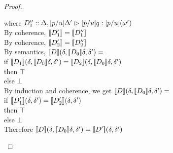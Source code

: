 \begin{proof}
\begin{enumerate}
\begin{itemize}
\begin{tabbedproof}
      \oooo where $D''_1 :: \judgeA[{\Delta, [p/u]\Delta'}]{[p/u]q}{[p/u](\omega')}$ \\
      \oooo By coherence, $\interp{D'_1} = \interp{D''_1}$ \\
      \oooo By coherence, $\interp{D'_2} = \interp{D''_2}$ \\
      \oooo By semantics, $\interp{D}(\delta, \interp{D_0}\delta, \delta') = $ \\
      \oooox if $\interp{D_1}(\delta, \interp{D_0}\delta, \delta') = 
                  \interp{D_2}(\delta, \interp{D_0}\delta, \delta')$ \\
      \oooox then $\top$ \\
      \oooox else $\bot$ \\
      \oooo By induction and coherence, we get $\interp{D}(\delta, \interp{D_0}\delta, \delta') = $ \\
      \oooox if $\interp{D'_1}(\delta, \delta') = 
                 \interp{D'_2}(\delta, \delta')$ \\
      \oooox then $\top$ \\
      \oooox else $\bot$ \\
      \oooo Therefore $\interp{D}(\delta, \interp{D_0}\delta, \delta') = 
                       \interp{D'}(\delta, \delta')$ \\
    \end{tabbedproof}



\end{itemize}
\end{enumerate}
\end{proof}
